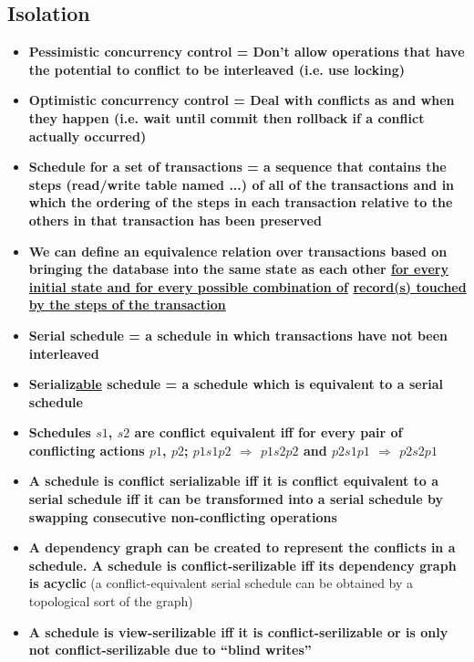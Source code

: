 \documentclass[20pt,a4paper,landscape]{extarticle}
\begin{document}
\begin{flushleft}
\subsection{Isolation}
\begin{itemize}
\item \textbf{Pessimistic concurrency control = Don’t allow operations that have the potential to conflict to be interleaved (i.e. use locking)}
\item \textbf{Optimistic concurrency control = Deal with conflicts as and when they happen (i.e. wait until commit then rollback if a conflict actually occurred)}
\item \textbf{Schedule for a set of transactions = a sequence that contains the steps (read/write table named ...) of all of the transactions and in which the ordering of the steps in each transaction relative to the others in that transaction has been preserved}
\item \textbf{We can define an equivalence relation over transactions based on bringing the database into the same state as each other \underline{for every initial state and for every possible combination of} \underline{record(s) touched by the steps of the transaction}}
\item \textbf{Serial schedule = a schedule in which transactions have not been interleaved}
\item \textbf{Serializ\underline{able} schedule = a schedule which is equivalent to a serial schedule}
\item \textbf{Schedules \boldmath$s1$, $s2$ are conflict equivalent iff for every pair of conflicting actions $p1$, $p2$; $p1 s1 p2$ $\Rightarrow$ $p1 s2 p2$ and $p2 s1 p1$ $\Rightarrow$ $p2 s2 p1$
}
\item \textbf{A schedule is conflict serializable iff it is conflict equivalent to a serial schedule iff it can be transformed into a serial schedule by swapping consecutive non-conflicting operations}
\item \textbf{A dependency graph can be created to represent the conflicts in a schedule. A schedule is conflict-serilizable iff its dependency graph is acyclic} (a conflict-equivalent serial schedule can be obtained by a topological sort of the graph)
\item \textbf{A schedule is view-serilizable iff it is conflict-serilizable or is only not conflict-serilizable due to “blind writes”}
\end{itemize}

\end{flushleft}
\end{document}
